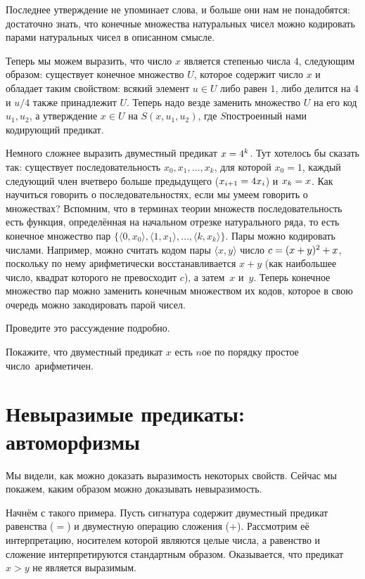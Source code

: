 Последнее утверждение не упоминает слова, и больше они
нам не понадобятся: достаточно знать, что конечные множества
натуральных чисел можно кодировать парами натуральных чисел
в описанном смысле.

Теперь мы можем выразить, что число $x$ является степенью числа
$4$, следующим образом: существует конечное множество $U$,
которое содержит число $x$ и обладает таким свойством: всякий
элемент $u\in U$ либо равен $1$, либо делится на $4$ и $u/4$
также принадлежит $U$. Теперь надо везде заменить множество $U$
на его код $u_1,u_2$, а утверждение $x\in U$ на $S(x,u_1,u_2)$,
где $S$\т построенный нами кодирующий предикат.

Немного сложнее выразить двуместный предикат $x\hm=4^k$. Тут
хотелось бы сказать так: существует последовательность
$x_0,x_1,\dots,x_k$, для которой $x_0=1$, каждый следующий член
вчетверо больше пре\-дыдущего ($x_{i+1}\hm=4x_i$) и $x_k\hm= x$.
Как научиться говорить о последовательностях, если мы умеем
говорить о множествах? Вспомним, что в терминах теории множеств
последовательность есть функция, определённая на начальном
отрезке натурального ряда, то есть конечное множество пар
$\{\langle 0,x_0\rangle, \langle 1, x_1\rangle,\dots, \langle k,
x_k\rangle\}$. Пары можно кодировать числами. Например, можно
считать кодом пары $\langle x,y\rangle$ число
$c\hm=(x+y)^2+x$, поскольку по нему арифметически
восстанавливается $x+y$ (как наибольшее число, квадрат которого
не превосходит $c$), а затем~$x$ и~$y$. Теперь конечное
множество пар можно заменить конечным множеством их кодов,
которое в свою очередь можно закодировать парой чисел.

\begin{problem}
Проведите это рассуждение подробно.
\end{problem}

\begin{problem}
Покажите, что двуместный предикат  $x$ есть $n$\д ое
по порядку простое число\ арифметичен.
\end{problem}

\section{Невыразимые предикаты: автоморфизмы}
        \label{automorphisms}
Мы видели, как можно доказать выразимость некоторых свойств.
Сейчас мы покажем, каким образом можно доказывать
невыразимость.

Начнём с такого примера. Пусть
сигнатура содержит двуместный предикат равенства
($=$) и двуместную операцию сложения ($+$). Рассмотрим её
интерпретацию, носителем которой являются целые числа, а
равенство и сложение интерпретируются стандартным образом.
Оказывается, что предикат ${x>y}$ не является выразимым.

